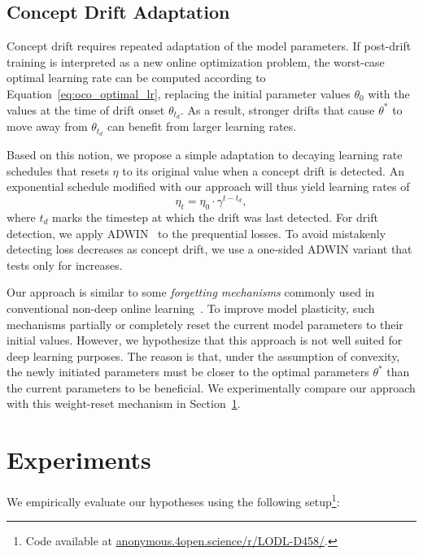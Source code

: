 \documentclass[runningheads]{llncs}
\begin{document}
\subsection{Concept Drift Adaptation}

Concept drift requires repeated adaptation of the model parameters.
If post-drift training is interpreted as a new online optimization problem, the worst-case optimal learning rate can be computed according to Equation~\ref{eq:oco_optimal_lr}, replacing the initial parameter values $\theta_0$ with the values at the time of drift onset $\theta_{t_d}$.
As a result, stronger drifts that cause $\theta^*$ to move away from $\theta_{t_d}$ can benefit from larger learning rates.

Based on this notion, we propose a simple adaptation to decaying learning rate schedules that resets $\eta$ to its original value when a concept drift is detected.
An exponential schedule modified with our approach will thus yield learning rates of
\begin{equation}
	\eta_t = \eta_0 \cdot \gamma^{t-t_d},
\end{equation}\label{eq:drift_reset}
where $t_d$ marks the timestep at which the drift was last detected.
For drift detection, we apply ADWIN~\cite{bifetLearningTimeChangingData2007} to the prequential losses.
To avoid mistakenly detecting loss decreases as concept drift, we use a one-sided ADWIN variant that tests only for increases.

Our approach is similar to some \textit{forgetting mechanisms} commonly used in conventional non-deep online learning~\cite{gamaSurveyConceptDrift2014}.
To improve model plasticity, such mechanisms partially or completely reset the current model parameters to their initial values.
However, we hypothesize that this approach is not well suited for deep learning purposes.
The reason is that, under the assumption of convexity, the newly initiated parameters must be closer to the optimal parameters $\theta^*$ than the current parameters to be beneficial.
We experimentally compare our approach with this weight-reset mechanism in Section~\ref{sec:experiments}.

\section{Experiments}\label{sec:experiments}

We empirically evaluate our hypotheses using the following setup\footnote[2]{Code available at \url{anonymous.4open.science/r/LODL-D458/}.}:
\end{document}
